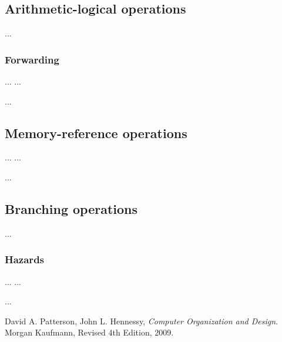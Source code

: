 \documentclass[11pt,twoside,a4paper]{article}
\begin{document}
\subsection{Arithmetic-logical operations}
...

\subsubsection{Forwarding}
\begin{multicols}{2}
\noindent ...
\vfill
\columnbreak
...
\lstset{language=[mips]Assembler}

...
\end{multicols}

\subsection{Memory-reference operations}
\begin{multicols}{2}
\noindent ...
\vfill
\columnbreak
...
\lstset{language=[mips]Assembler}

...
\end{multicols}

\subsection{Branching operations}
...

\subsubsection{Hazards}
\begin{multicols}{2}
\noindent ...
\vfill
\columnbreak
...
\lstset{language=[mips]Assembler}

...
\end{multicols}

\newpage
\pagestyle{fancy}
\begin{thebibliography}{9}

  David A. Patterson, John L. Hennessy,
  \emph{Computer Organization and Design}.
  Morgan Kaufmann,
  Revised 4th Edition,
  2009.

\end{thebibliography}
\end{document}
